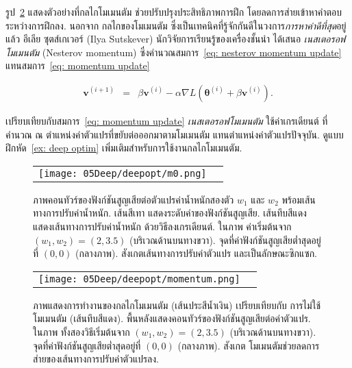 รูป~\ref{fig: momentum compared}
แสดงตัวอย่างที่กลไกโมเมนตัม ช่วยปรับปรุงประสิทธิภาพการฝึก
โดยลดการส่ายเข้าหาคำตอบระหว่างการฝึกลง.
นอกจาก กลไกของโมเมนตัม
ซึ่งเป็นเทคนิคที่รู้จักกันดีในวงการ\textit{การหาค่าดีที่สุด}อยู่แล้ว
อีเลีย ซุตส์เกเวอร์ (Ilya Sutskever)
นักวิจัยการเรียนรู้ของเครื่องชั้นนำ
ได้เสนอ
\textit{เนสเตอรอฟโมเมนตัม} (Nesterov momentum\cite{SutskeverEtAl2013a})
ซึ่งคำนวณสมการ~\ref{eq: nesterov momentum update} แทนสมการ~\ref{eq: momentum update}

\begin{eqnarray}
\bm{v}^{(i+1)} &=&
\beta \bm{v}^{(i)} - \alpha 
\nabla L(\bm{\theta}^{(i)} + \beta \bm{v}^{(i)})
\label{eq: nesterov momentum update}.
\end{eqnarray}

เปรียบเทียบกับสมการ~\ref{eq: momentum update}
\textit{เนสเตอรอฟโมเมนตัม}
ใช้ค่าเกรเดียนต์ ที่คำนวณ
ณ ตำแหน่งค่าตัวแปรที่ขยับต่อออกมาตามโมเมนตัม
แทนตำแหน่งค่าตัวแปรปัจจุบัน.
ดูแบบฝึกหัด~\ref{ex: deep optim} %
เพิ่มเติมสำหรับการใช้งานกลไกโมเมนตัม.

%
\begin{figure}
	\begin{center}
		\begin{tabular}{cc}
			\texttt{[image: 05Deep/deepopt/m0.png]}	
		\end{tabular}		
		\caption[ภาพแสดงพฤติกรรมซิกแซกของวิธีลงเกรเดียนต์]{ภาพคอนทัวร์ของฟังก์ชันสูญเสียต่อตัวแปรค่าน้ำหนักสองตัว $w_1$ และ $w_2$
		พร้อมเส้นทางการปรับค่าน้ำหนัก.
		เส้นสีเทา แสดงระดับค่าของฟังก์ชันสูญเสีย.
	เส้นทึบสีแดง แสดงเส้นทางการปรับค่าน้ำหนัก ด้วยวิธีลงเกรเดียนต์.
ในภาพ ค่าเริ่มต้นจาก $(w_1, w_2)=(2, 3.5)$ (บริเวณด้านบนทางขวา).
จุดที่ค่าฟังก์ชันสูญเสียต่ำสุดอยู่ที่ $(0,0)$ (กลางภาพ).
สังเกตเส้นทางการปรับค่าตัวแปร
และเป็นลักษณะซิกแซก.}
		\label{fig: zig-zag behavior}
	\end{center}
\end{figure}
%


%
\begin{figure}
	\begin{center}
		\begin{tabular}{cc}
			\texttt{[image: 05Deep/deepopt/momentum.png]}	
		\end{tabular}		
		\caption[ภาพแสดงการทำงานของกลไกโมเมนตัม]{ภาพแสดงการทำงานของกลไกโมเมนตัม (เส้นประสีน้ำเงิน) เปรียบเทียบกับ
		การไม่ใช้โมเมนตัม (เส้นทึบสีแดง).
		พื้นหลังแสดงคอนทัวร์ของฟังก์ชันสูญเสียต่อค่าตัวแปร.
		ในภาพ ทั้งสองวิธีเริ่มต้นจาก $(w_1, w_2)=(2, 3.5)$ (บริเวณด้านบนทางขวา).
		จุดที่ค่าฟังก์ชันสูญเสียต่ำสุดอยู่ที่ $(0,0)$ (กลางภาพ).
	สังเกต โมเมนตัมช่วยลดการส่ายของเส้นทางการปรับค่าตัวแปรลง.}
		\label{fig: momentum compared}
	\end{center}
\end{figure}
%


